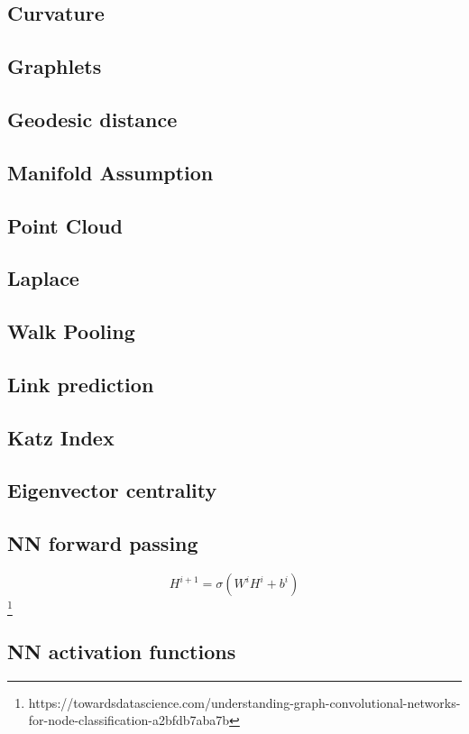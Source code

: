 \subsection{Curvature}
\subsection{Graphlets}
\subsection{Geodesic distance}
\subsection{Manifold Assumption}
\subsection{Point Cloud}
\subsection{Laplace}
\subsection{Walk Pooling}
\subsection{Link prediction}
\subsection{Katz Index}

\subsection{Eigenvector centrality}
\subsection{NN forward passing}
\begin{equation}
    H^{i + 1} = \sigma ( W^i H ^i + b^i)
\end{equation}
\footnote{https://towardsdatascience.com/understanding-graph-convolutional-networks-for-node-classification-a2bfdb7aba7b}

\subsection{NN activation functions}
